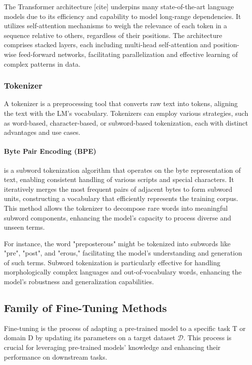 \documentclass{article}
\newcounter{para}
\begin{document}
The Transformer architecture [cite] underpins many state-of-the-art language models due to its efficiency and capability to model long-range dependencies. It utilizes self-attention mechanisms to weigh the relevance of each token in a sequence relative to others, regardless of their positions. The architecture comprises stacked layers, each including multi-head self-attention and position-wise feed-forward networks, facilitating parallelization and effective learning of complex patterns in data.

\subsubsection{Tokenizer} \label{sec:pre-tokenizer}

A tokenizer is a preprocessing tool that converts raw text into tokens, aligning the text with the LM's vocabulary. Tokenizers can employ various strategies, such as word-based, character-based, or subword-based tokenization, each with distinct advantages and use cases.

\paragraph{Byte Pair Encoding (BPE)} is a subword tokenization algorithm that operates on the byte representation of text, enabling consistent handling of various scripts and special characters. It iteratively merges the most frequent pairs of adjacent bytes to form subword units, constructing a vocabulary that efficiently represents the training corpus. This method allows the tokenizer to decompose rare words into meaningful subword components, enhancing the model's capacity to process diverse and unseen terms.

For instance, the word "preposterous" might be tokenized into subwords like "pre", "post", and "erous," facilitating the model's understanding and generation of such terms. Subword tokenization is particularly effective for handling morphologically complex languages and out-of-vocabulary words, enhancing the model's robustness and generalization capabilities.


\subsection{Family of Fine-Tuning Methods}
Fine-tuning is the process of adapting a pre-trained model to a specific task T or domain D by updating its parameters on a target dataset \(\mathcal{D}\). This process is crucial for leveraging pre-trained models' knowledge and enhancing their performance on downstream tasks.
\end{document}
